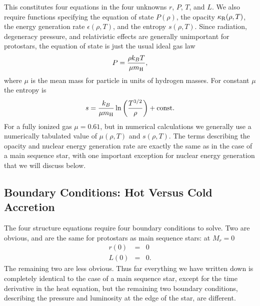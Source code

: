 This constitutes four equations in the four unknowns $r$, $P$, $T$, and $L$.  We also require functions specifying the equation of state $P(\rho)$, the opacity $\kappa_{\rm R}(\rho,T)$, the energy generation rate $\epsilon(\rho,T)$, and the entropy $s(\rho,T)$. Since radiation, degeneracy pressure, and relativistic effects are generally unimportant for protostars, the equation of state is just the usual ideal gas law
\begin{equation}
P = \frac{\rho k_B T}{\mu m_{\rm H}},
\end{equation}
where $\mu$ is the mean mass for particle in units of hydrogen masses. For constant $\mu$ the entropy is
\begin{equation}
\label{eq:entropy}
s = \frac{k_B}{\mu m_{\rm H}} \ln \left(\frac{T^{3/2}}{\rho}\right) + \mbox{const}.
\end{equation}
For a fully ionized gas $\mu=0.61$, but in numerical calculations we generally use a numerically tabulated value of $\mu(\rho, T)$ and $s(\rho,T)$. The terms describing the opacity and nuclear energy generation rate are exactly the same as in the case of a main sequence star, with one important exception for nuclear energy generation that we will discuss below.

\subsection{Boundary Conditions: Hot Versus Cold Accretion}

The four structure equations require four boundary conditions to solve. Two are obvious, and are the same for protostars as main sequence stars: at $M_r=0$
\begin{eqnarray}
r(0) & = & 0\\
L(0) & = & 0.
\end{eqnarray}
The remaining two are less obvious. Thus far everything we have written down is completely identical to the case of a main sequence star, except for the time derivative in the heat equation, but the remaining two boundary conditions, describing the pressure and luminosity at the edge of the star, are different.

